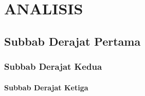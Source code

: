 \chapter{ANALISIS}

\section{Subbab Derajat Pertama}
\lipsum[1-5]

\subsection{Subbab Derajat Kedua}
\lipsum[1]

\subsubsection{Subbab Derajat Ketiga}
\lipsum[1]